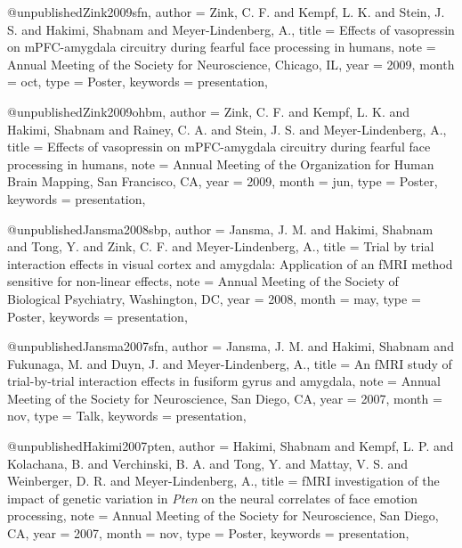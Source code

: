 @unpublished{Zink2009sfn,
  author   = {Zink, C. F. and Kempf, L. K. and Stein, J. S.
              and Hakimi, Shabnam and Meyer-Lindenberg, A.},
  title    = {Effects of vasopressin on {mPFC}-amygdala circuitry during
              fearful face processing in humans},
  note     = {Annual Meeting of the Society for Neuroscience, Chicago, IL},
  year     = {2009},
  month    = oct,
  type     = {Poster},
  keywords = {presentation},
}

@unpublished{Zink2009ohbm,
  author   = {Zink, C. F. and Kempf, L. K. and Hakimi, Shabnam
              and Rainey, C. A. and Stein, J. S. and Meyer-Lindenberg, A.},
  title    = {Effects of vasopressin on {mPFC}-amygdala circuitry during
              fearful face processing in humans},
  note     = {Annual Meeting of the Organization for Human Brain Mapping,
              San Francisco, CA},
  year     = {2009},
  month    = jun,
  type     = {Poster},
  keywords = {presentation},
}


@unpublished{Jansma2008sbp,
  author   = {Jansma, J. M. and Hakimi, Shabnam and Tong, Y.
              and Zink, C. F. and Meyer-Lindenberg, A.},
  title    = {Trial by trial interaction effects in visual cortex and
              amygdala: Application of an {fMRI} method sensitive for
              non-linear effects},
  note     = {Annual Meeting of the Society of Biological Psychiatry,
              Washington, DC},
  year     = {2008},
  month    = may,
  type     = {Poster},
  keywords = {presentation},
}


@unpublished{Jansma2007sfn,
  author   = {Jansma, J. M. and Hakimi, Shabnam and Fukunaga, M.
              and Duyn, J. and Meyer-Lindenberg, A.},
  title    = {An {fMRI} study of trial-by-trial interaction effects in
              fusiform gyrus and amygdala},
  note     = {Annual Meeting of the Society for Neuroscience,
              San Diego, CA},
  year     = {2007},
  month    = nov,
  type     = {Talk},
  keywords = {presentation},
}

@unpublished{Hakimi2007pten,
  author   = {Hakimi, Shabnam and Kempf, L. P. and Kolachana, B.
              and Verchinski, B. A. and Tong, Y. and Mattay, V. S.
              and Weinberger, D. R. and Meyer-Lindenberg, A.},
  title    = {{fMRI} investigation of the impact of genetic variation in
              \textit{Pten} on the neural correlates of face emotion
              processing},
  note     = {Annual Meeting of the Society for Neuroscience,
              San Diego, CA},
  year     = {2007},
  month    = nov,
  type     = {Poster},
  keywords = {presentation},
}

